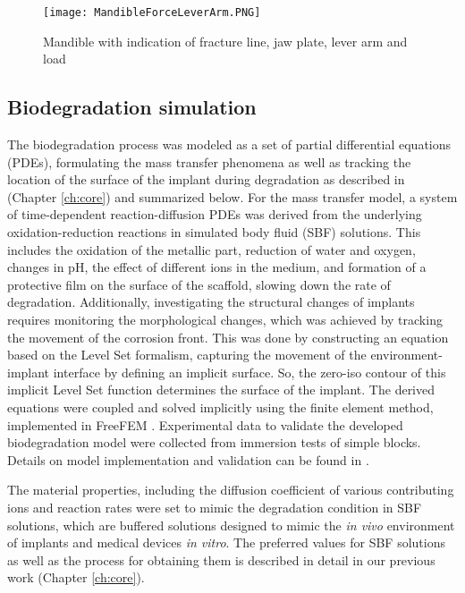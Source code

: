 \begin{figure}[h]
    \centering
    \medskip
    \texttt{[image: MandibleForceLeverArm.PNG]}
    \caption{Mandible with indication of fracture line, jaw plate, lever arm and load}
    \label{fig:MandibleForceLeverArm}
\end{figure}


\subsection{Biodegradation simulation}
\label{sec:biodeg}

The biodegradation process was modeled as a set of partial differential equations (\gls{PDE}s), formulating the mass transfer phenomena as well as tracking the location of the surface of the implant during degradation as described in \cite{Barzegari2021} (Chapter \ref{ch:core}) and summarized below. For the mass transfer model, a system of time-dependent reaction-diffusion \gls{PDE}s was derived from the underlying oxidation-reduction reactions in simulated body fluid (\gls{SBF}) solutions. This includes the oxidation of the metallic part, reduction of water and oxygen, changes in pH, the effect of different ions in the medium, and formation of a protective film on the surface of the scaffold, slowing down the rate of degradation. Additionally, investigating the structural changes of implants requires monitoring the morphological changes, which was achieved by tracking the movement of the corrosion front. This was done by constructing an equation based on the Level Set formalism, capturing the movement of the environment-implant interface by defining an implicit surface. So, the zero-iso contour of this implicit Level Set function determines the surface of the implant. The derived equations were coupled and solved implicitly using the finite element method, implemented in FreeFEM \cite{Hecht2012}. Experimental data to validate the developed biodegradation model were collected from immersion tests of simple blocks. Details on model implementation and validation can be found in \cite{Barzegari2021}.

The material properties, including the diffusion coefficient of various contributing ions and reaction rates were set to mimic the degradation condition in \gls{SBF} solutions, which are buffered solutions designed to mimic the \textit{in vivo} environment of implants and medical devices \textit{in vitro}. The preferred values for \gls{SBF} solutions as well as the process for obtaining them is described in detail in our previous work \cite{Barzegari2021} (Chapter \ref{ch:core}).

